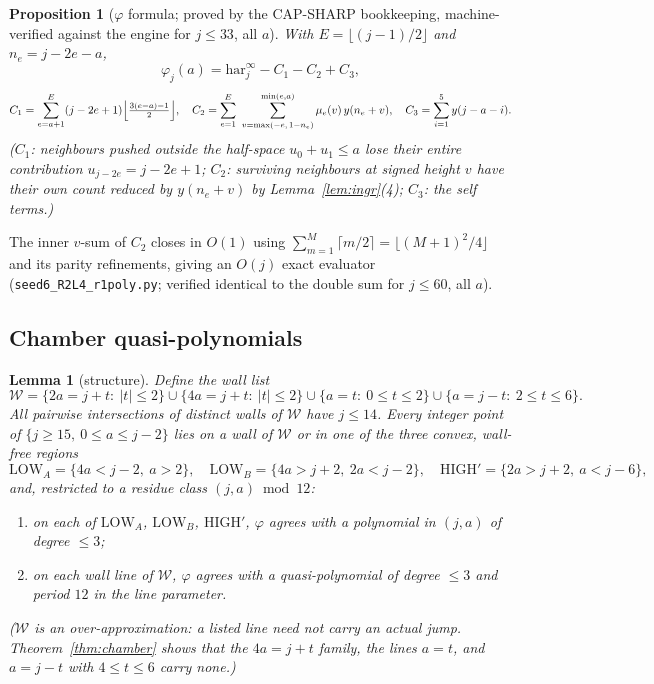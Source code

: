 \documentclass[11pt]{article}
\newtheorem{lemma}[theorem]{Lemma}
\newtheorem{proposition}[theorem]{Proposition}
\theoremstyle{definition}
\theoremstyle{remark}
\newcommand{\har}{\mathrm{har}}
\newcommand{\haru}{\har^{\infty}}
\begin{document}
\begin{proposition}[$\varphi$ formula; proved by the CAP-SHARP bookkeeping,
machine-verified against the engine for $j\le33$, all $a$]\label{prop:phi}
With $E=\lfloor(j-1)/2\rfloor$ and $n_e=j-2e-a$,
\[
\varphi_j(a)=\haru_j-C_1-C_2+C_3,
\]
\[
C_1=\sum_{e=a+1}^{E}(j-2e+1)\Bigl\lfloor\tfrac{3(e-a)-1}{2}\Bigr\rfloor,\quad
C_2=\sum_{e=1}^{E}\ \sum_{v=\max(-e,\,1-n_e)}^{\min(e,a)}\mu_e(v)\,
y(n_e+v),\quad
C_3=\sum_{i=1}^{5}y(j-a-i).
\]
($C_1$: neighbours pushed outside the half-space $u_0+u_1\le a$ lose their
entire contribution $u_{j-2e}=j-2e+1$; $C_2$: surviving neighbours at
signed height $v$ have their own count reduced by
$y(n_e+v)$ by Lemma~\ref{lem:ingr}(4); $C_3$: the self terms.)
\end{proposition}

The inner $v$-sum of $C_2$ closes in $O(1)$ using
$\sum_{m=1}^{M}\lceil m/2\rceil=\lfloor(M+1)^2/4\rfloor$ and its parity
refinements, giving an $O(j)$ exact evaluator
(\texttt{seed6\_R2L4\_r1poly.py}; verified identical to the double sum for
$j\le60$, all $a$).

\subsection{Chamber quasi-polynomials}

\begin{lemma}[structure]\label{lem:struct}
Define the wall list
\[
\mathcal{W}=\bigl\{2a=j+t:\ |t|\le2\bigr\}\cup\bigl\{4a=j+t:\ |t|\le2\bigr\}
\cup\bigl\{a=t:\ 0\le t\le2\bigr\}\cup\bigl\{a=j-t:\ 2\le t\le6\bigr\}.
\]
All pairwise intersections of distinct walls of $\mathcal{W}$ have
$j\le14$. Every integer point of $\{j\ge15,\ 0\le a\le j-2\}$ lies on a
wall of $\mathcal{W}$ or in one of the three convex, wall-free regions
\[
\mathrm{LOW}_A=\{4a<j-2,\ a>2\},\quad
\mathrm{LOW}_B=\{4a>j+2,\ 2a<j-2\},\quad
\mathrm{HIGH}'=\{2a>j+2,\ a<j-6\},
\]
and, restricted to a residue class $(j,a)\bmod 12$:
\begin{enumerate}
\item on each of $\mathrm{LOW}_A$, $\mathrm{LOW}_B$, $\mathrm{HIGH}'$,
$\varphi$ agrees with a polynomial in $(j,a)$ of degree $\le3$;
\item on each wall line of $\mathcal{W}$, $\varphi$ agrees with a
quasi-polynomial of degree $\le3$ and period $12$ in the line parameter.
\end{enumerate}
($\mathcal{W}$ is an over-approximation: a listed line need not carry an
actual jump. Theorem~\ref{thm:chamber} shows that the $4a=j+t$ family, the
lines $a=t$, and $a=j-t$ with $4\le t\le6$ carry none.)
\end{lemma}
\end{document}
